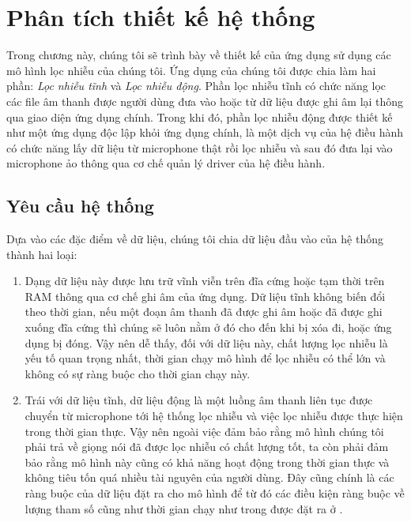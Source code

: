 \newcommand{\deimg}[1]{parts/design/img/#1}
\setupfont{13pt}

\chapter{Phân tích thiết kế hệ thống}\label{chapter::design}
	
	Trong chương này, chúng tôi sẽ trình bày về thiết kế của ứng dụng sử dụng các mô hình lọc nhiễu của chúng tôi. Ứng dụng của chúng tôi được chia làm hai phần: \textit{Lọc nhiễu tĩnh} và \textit{Lọc nhiễu động}. Phần lọc nhiễu tĩnh có chức năng lọc các file âm thanh được người dùng đưa vào hoặc từ dữ liệu được ghi âm lại thông qua giao diện ứng dụng chính. Trong khi đó, phần lọc nhiễu động được thiết kế như một ứng dụng độc lập khỏi ứng dụng chính, là một dịch vụ của hệ điều hành có chức năng lấy dữ liệu từ microphone thật rồi lọc nhiễu và sau đó đưa lại vào microphone ảo thông qua cơ chế quản lý driver của hệ điều hành.

	\section{Yêu cầu hệ thống}
		
		Dựa vào các đặc điểm về dữ liệu, chúng tôi chia dữ liệu đầu vào của hệ thống thành hai loại:
		
		\begin{enumerate}[1.]
			\item {} Dạng dữ liệu này được lưu trữ vĩnh viễn trên đĩa cứng hoặc tạm thời trên RAM thông qua cơ chế ghi âm của ứng dụng. Dữ liệu tĩnh không biến đổi theo thời gian, nếu một đoạn âm thanh đã được ghi âm hoặc đã được ghi xuống đĩa cứng thì chúng sẽ luôn nằm ở đó cho đến khi bị xóa đi, hoặc ứng dụng bị đóng. Vậy nên dễ thấy, đối với dữ liệu này, chất lượng lọc nhiễu là yếu tố quan trọng nhất, thời gian chạy mô hình để lọc nhiễu có thể lớn và không có sự ràng buộc cho thời gian chạy này.
			\item {} Trái với dữ liệu tĩnh, dữ liệu động là một luồng âm thanh liên tục được chuyển từ microphone tới hệ thống lọc nhiễu và việc lọc nhiễu được thực hiện trong thời gian thực. Vậy nên ngoài việc đảm bảo rằng mô hình chúng tôi phải trả về giọng nói đã được lọc nhiễu có chất lượng tốt, ta còn phải đảm bảo rằng mô hình này cũng có khả năng hoạt động trong thời gian thực và không tiêu tốn quá nhiều tài nguyên của người dùng. Đây cũng chính là các ràng buộc của dữ liệu đặt ra cho mô hình để từ đó các điều kiện ràng buộc về lượng tham số cũng như thời gian chạy như trong  được đặt ra ở .
		\end{enumerate}
		
